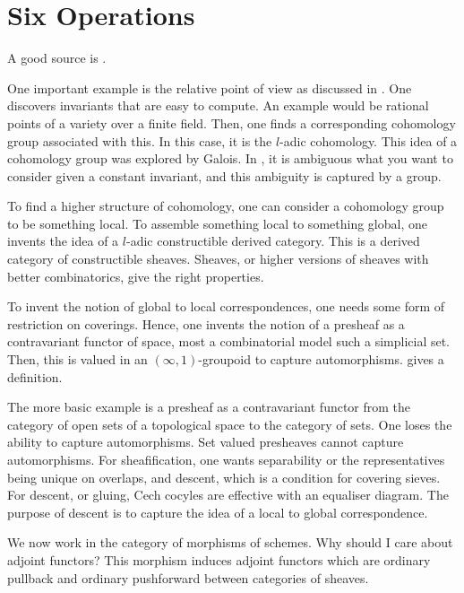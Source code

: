 \section{Six Operations}

A good source is \cite{Gallauer2022SixFunctor}.

One important example is the relative point of view as discussed in \cite{Gallauer2022SixFunctor}. One discovers invariants that are easy to compute. An example would be rational points of a variety over a finite field. Then, one finds a corresponding cohomology group associated with this. In this case, it is the $l$-adic cohomology. This idea of a cohomology group was explored by Galois. In \cite{Andre2008Ambiguity}, it is ambiguous what you want to consider given a constant invariant, and this ambiguity is captured by a group.

To find a higher structure of cohomology, one can consider a cohomology group to be something local. To assemble something local to something global, one invents the idea of a $l$-adic constructible derived category. This is a derived category of constructible sheaves. Sheaves, or higher versions of sheaves with better combinatorics, give the right properties.

To invent the notion of global to local correspondences, one needs some form of restriction on coverings. Hence, one invents the notion of a presheaf as a contravariant functor of space, most a combinatorial model such a simplicial set. Then, this is valued in an $(\infty,1)$-groupoid to capture automorphisms. \cite{nLabInfinityOneSheaf} gives a definition.

The more basic example is a presheaf as a contravariant functor from the category of open sets of a topological space to the category of sets. One loses the ability to capture automorphisms. Set valued presheaves cannot capture automorphisms. For sheafification, one wants separability or the representatives being unique on overlaps, and descent, which is a condition for covering sieves. For descent, or gluing, Cech cocyles are effective with an equaliser diagram. The purpose of descent is to capture the idea of a local to global correspondence.

We now work in the category of morphisms of schemes. Why should I care about adjoint functors? This morphism induces adjoint functors which are ordinary pullback and ordinary pushforward between categories of sheaves.